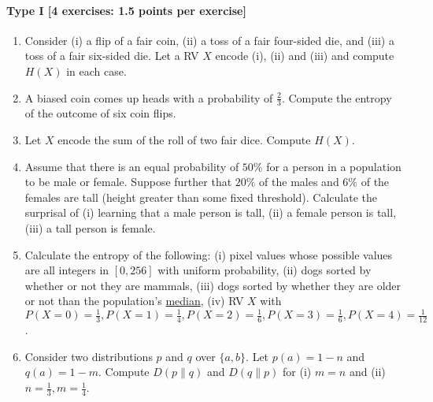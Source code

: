 \documentclass{article}
\begin{document}
\paragraph{Type I [4 exercises: 1.5 points per exercise]}
\begin{enumerate}
	\item Consider (i) a flip of a fair coin, (ii) a toss of a fair four-sided die, and (iii) a toss of a fair six-sided die. Let a RV $X$ encode (i), (ii) and (iii) and compute $H(X)$ in each case.
	\item A biased coin comes up heads with a probability of $\frac{2}{3}$. Compute the entropy of the outcome of six coin flips.
	\item Let $X$ encode the sum of the roll of two fair dice. Compute $H(X)$.
	\item Assume that there is an equal probability of $50\%$ for a person in a population to be male or female. Suppose further that $20\%$ of the males and $6\%$ of the females are tall (height greater than some fixed threshold). Calculate the surprisal of (i) learning that a male person is tall, (ii) a female person is tall, (iii) a tall person is female.
	\item Calculate the entropy of the following: (i) pixel values whose possible values are all integers in $[0,256]$ with uniform probability, (ii) dogs sorted by whether or not they are mammals, (iii) dogs sorted by whether they are older or not than the population's \href{https://en.wikipedia.org/wiki/Median}{median}, (iv) RV $X$ with $P(X = 0) = \frac{1}{3}, P(X = 1) = \frac{1}{4}, P(X = 2) = \frac{1}{6}, P(X = 3) = \frac{1}{6}, P(X = 4) = \frac{1}{12}$.
	\item Consider two distributions $p$ and $q$ over $\{a,b\}$. Let $p(a) = 1 - n$ and $q(a) = 1 - m$. Compute $D(p\parallel q)$ and $D(q \parallel p)$ for (i) $m = n$ and (ii) $n = \frac{1}{3}, m = \frac{1}{4}$.
\end{enumerate}
\end{document}

